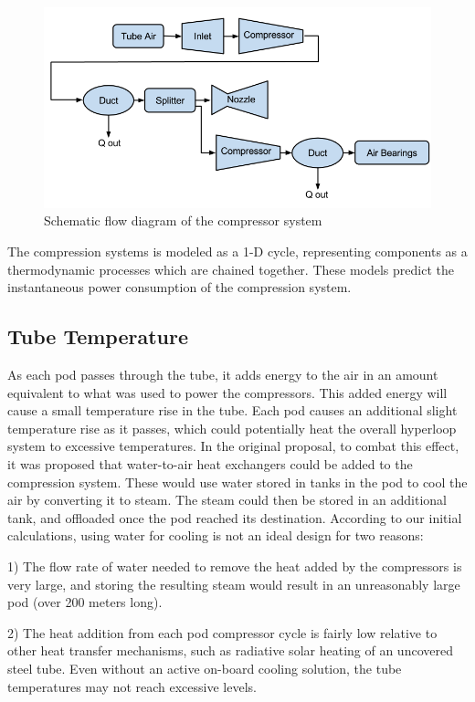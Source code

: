 \documentclass[heading.tex]{subfiles}
\begin{document}
\begin{figure}[hbtp]
\centering
\includegraphics[scale=0.5]{images/compressor_schematic.png}
\caption{Schematic flow diagram of the compressor system}
\end{figure}

The compression systems is modeled as a 1-D cycle, representing components as a thermodynamic processes which are chained together.
These models predict the instantaneous power consumption of the compression system.

\subsection{Tube Temperature}

As each pod passes through the tube, it adds energy to the air in an amount equivalent to what was used to power the compressors. This
added energy will cause a small temperature rise in the tube. Each pod causes an additional slight temperature rise as it passes, which could
potentially heat the overall hyperloop system to excessive temperatures. In the original proposal, to combat this effect, it was proposed
that water-to-air heat exchangers could be added to the compression system. These would use water stored in tanks in the pod to cool the
air by converting it to steam. The steam could then be stored in an additional tank, and offloaded once the pod reached its destination.
According to our initial calculations, using water for cooling is not an ideal design for two reasons:

1) The flow rate of water needed to remove the heat added by the compressors is very large, and storing the resulting steam would result
in an unreasonably large pod (over 200 meters long).

2) The heat addition from each pod compressor cycle is fairly low relative to other heat transfer mechanisms, such as radiative solar
heating of an uncovered steel tube. Even without an active on-board cooling solution, the tube temperatures may not reach excessive
levels.
\end{document}
